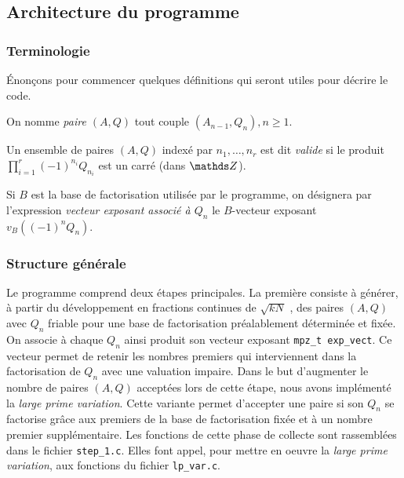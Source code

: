 \subsection{Architecture du programme}

\subsubsection{Terminologie}

Énonçons pour commencer quelques définitions qui seront utiles pour décrire le
code. 

\begin{definition}
	On nomme \emph{paire $(A, Q)$} tout couple $(A_{n-1}, Q_n), n\geq 1$.
\end{definition}

\begin{definition}
	Un ensemble de paires $(A, Q)$ indexé par $n_1, \dots, n_r$ est dit
	\emph{valide} si le produit $\prod_{i=1}^r (-1)^{n_i} Q_{n_i}$ est un carré
	(dans $\Z$).
\end{definition}

\begin{definition}
    Si $B$ est la base de factorisation utilisée par le programme, on 
    désignera par l'expression \emph{vecteur exposant associé à $Q_n$} 
    le $B$-vecteur exposant $v_B((-1)^n Q_n)$.
\end{definition}

\subsubsection{Structure générale}

Le programme comprend deux étapes principales. La première consiste à générer,
à partir du développement en fractions continues de $\sqrt{kN}$ , des paires $(A, Q)$ avec $Q_n$ friable pour une base de factorisation
préalablement déterminée et fixée. On associe à chaque $Q_n$ ainsi produit son
vecteur exposant \texttt{mpz\_t exp\_vect}. Ce vecteur permet de retenir les
nombres premiers qui interviennent dans la factorisation de $Q_n$ avec une
valuation impaire. Dans le but d'augmenter le nombre de paires $(A,Q)$
acceptées lors de cette étape, nous avons implémenté la \textit{large prime
variation}. Cette variante permet d'accepter une paire si son $Q_n$ se
factorise grâce aux premiers de la base de factorisation fixée et à un nombre
premier supplémentaire. Les fonctions de cette phase de collecte sont rassemblées dans
le fichier \texttt{step\_1.c}. Elles font appel, pour mettre en oeuvre la
\textit{large prime variation}, aux fonctions du fichier \texttt{lp\_var.c}. \\
 
